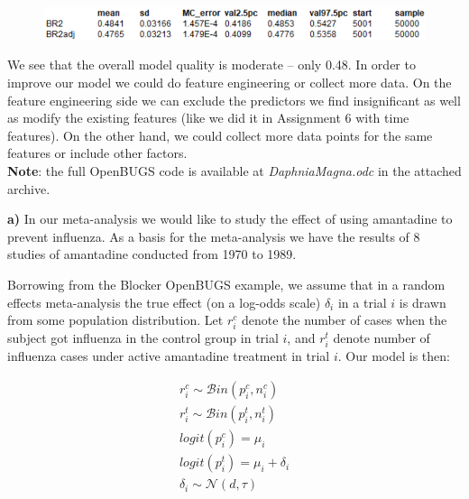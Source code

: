\documentclass[a4 paper]{article}
\begin{document}
\begin{figure}[H]
	\includegraphics[scale=1.0]{q2_4}
	\centering
	\label{q2_4}
\end{figure}

We see that the overall model quality is 
moderate -- only 0.48. In order to improve 
our model we could do feature engineering
or collect more data. On the feature engineering 
side we can exclude 
the predictors we find insignificant as 
well as modify the existing features (like 
we did it in Assignment 6 with time features).
On the other hand, we could collect more data points
for the same features or include other factors. \\



 

\textbf{Note}: the full OpenBUGS code is available 
at \textit{DaphniaMagna.odc}
in the attached archive. \\ 



\textbf{a)} In our meta-analysis
we would like to study the effect 
of using amantadine to 
prevent influenza. As a basis for 
the meta-analysis we have the results 
of 8 studies of amantadine 
conducted from 1970 to 1989.

Borrowing from the Blocker OpenBUGS example, 
we assume that in a random effects meta-analysis 
the true effect (on a log-odds scale) $\delta_i$ 
in a trial $i$ is 
drawn from some population distribution.
Let  $r^c_i$ denote the number of cases when 
the subject got influenza in the 
control group 
in trial $i$, and $r^t_i$ denote number of influenza 
cases 
under active amantadine treatment in trial $i$.  
Our model is then:

\begin{align*}
r_{i}^{c}	\sim\mathcal{B}in(p_{i}^{c},n_{i}^{c}) \\
r_{i}^{t}	\sim\mathcal{B}in(p_{i}^{t},n_{i}^{t}) \\
logit(p_{i}^{c})	=\mu_{i} \\
logit(p_{i}^{t})	=\mu_{i}+\delta_{i} \\
\delta_{i}	\sim\mathcal{N}(d,\tau)
\end{align*}
\end{document}
